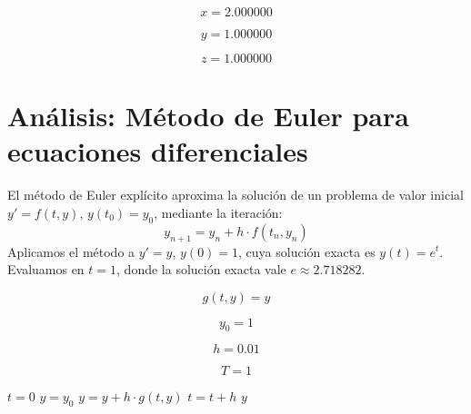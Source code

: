 \documentclass{article}
\begin{document}
\begin{equation}
    x =
    2.000000
    \label{eq:res:x}
\end{equation}

\begin{equation}
    y =
    1.000000
    \label{eq:res:y}
\end{equation}

\begin{equation}
    z =
    1.000000
    \label{eq:res:z}
\end{equation}


\section{Análisis: Método de Euler para ecuaciones diferenciales}

El método de Euler explícito aproxima la solución de un problema de valor inicial
$y' = f(t, y)$, $y(t_0) = y_0$, mediante la iteración:
\[
    y_{n+1} = y_n + h \cdot f(t_n, y_n)
\]
Aplicamos el método a $y' = y$, $y(0) = 1$, cuya solución exacta es $y(t) = e^t$.
Evaluamos en $t = 1$, donde la solución exacta vale $e \approx 2.718282$.

\begin{equation}
    g(t, y) = y
    \label{eq:calc:g}
\end{equation}

\begin{equation}
    y_0 = 1
    \label{eq:calc:y0}
\end{equation}

\begin{equation}
    h = 0.01
    \label{eq:calc:h}
\end{equation}

\begin{equation}
    T = 1
    \label{eq:calc:T}
\end{equation}

\begin{algorithm}
\caption{Método de Euler para $y' = y$, $y(0) = 1$}
\begin{algorithmic}
    \STATE $t = 0$
    \STATE $y = y_0$
        \STATE $y = y + h \cdot g(t, y)$
        \STATE $t = t + h$
    \ENDWHILE
    \RETURN $y$
\end{algorithmic}
\end{algorithm}
\end{document}
